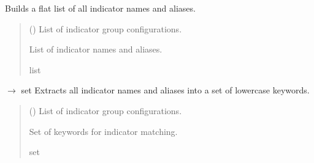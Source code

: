 \documentclass[letterpaper,10pt,english]{sphinxmanual}
\begin{document}

\begin{fulllineitems}
\label{\detokenize{autoapi/modules/input/emissions_parser/index:modules.input.emissions_parser.build_indicator_labels}}
\pysigstartsignatures
\pysiglinewithargsret
{}
{}
{}
\pysigstopsignatures
\sphinxAtStartPar
Builds a flat list of all indicator names and aliases.
\begin{quote}\begin{description}
\sphinxAtStartPar
{} () \textendash{} List of indicator group configurations.

\sphinxAtStartPar
List of indicator names and aliases.

\sphinxAtStartPar
list

\end{description}\end{quote}

\end{fulllineitems}


\begin{fulllineitems}
\label{\detokenize{autoapi/modules/input/emissions_parser/index:modules.input.emissions_parser.extract_keywords}}
\pysigstartsignatures
\pysiglinewithargsret
{}
{}
{{ $\rightarrow$ set}}
\pysigstopsignatures
\sphinxAtStartPar
Extracts all indicator names and aliases into a set of lowercase keywords.
\begin{quote}\begin{description}
\sphinxAtStartPar
{} () \textendash{} List of indicator group configurations.

\sphinxAtStartPar
Set of keywords for indicator matching.

\sphinxAtStartPar
set

\end{description}\end{quote}

\end{fulllineitems}
\end{document}

